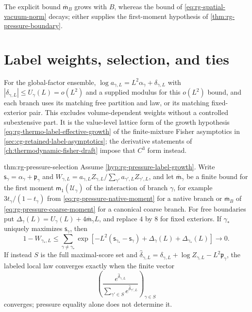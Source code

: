 The explicit bound $\overline{\mathsf m}_B$ grows with $B$, whereas the bound of
\cref{eq:rg-spatial-vacuum-norm} decays; either supplies the first-moment
hypothesis of \cref{thm:rg-pressure-boundary}.

\section{Label weights, selection, and ties}
\label{sec:rg-pressure-selection}

For the global-factor ensemble,
$\log a_{\gamma,L}=L^2\alpha_\gamma+\delta_{\gamma,L}$ with
$|\delta_{\gamma,L}|\leq U_\gamma(L)=o(L^2)$ and a supplied modulus for this
$o(L^2)$ bound, and each branch uses its matching free partition and law, or
its matching fixed-exterior pair. This excludes volume-dependent weights
without a controlled subextensive part. It is the value-level lattice form of
the growth hypothesis \cref{eq:rg-thermo-label-effective-growth} of the
finite-mixture Fisher asymptotics in \cref{sec:cg-retained-label-asymptotics};
the derivative statements of \cref{ch:thermodynamic-fisher-draft} impose that
$C^3$ form instead.

{thm:rg-pressure-selection}
Assume \cref{hyp:rg-pressure-label-growth}. Write
$\mathsf s_\gamma=\alpha_\gamma+\mathfrak p_\gamma$ and
$W_{\gamma,L}=a_{\gamma,L}Z_{\gamma,L}/\sum_{\gamma'}a_{\gamma',L}Z_{\gamma',L}$,
and let $\overline{\mathsf m}_\gamma$ be a finite bound for the first moment
$\mathsf m_1(\mathscr U_\gamma)$ of the interaction of branch $\gamma$, for example
$3t_\gamma/(1-t_\gamma)$ from \cref{eq:rg-pressure-native-moment} for a
native branch or $\overline{\mathsf m}_B$ of
\cref{eq:rg-pressure-coarse-moment} for a canonical coarse branch. For free
boundaries put $\Delta_\gamma(L)=U_\gamma(L)+4\overline{\mathsf m}_\gamma L$,
and replace $4$ by $8$ for fixed exteriors. If $\gamma_*$ uniquely maximizes
$\mathsf s_\gamma$, then
\begin{equation}
 1-W_{\gamma_*,L}\leq\sum_{\gamma\ne\gamma_*}
 \exp\left[-L^2(\mathsf s_{\gamma_*}-\mathsf s_\gamma)
                  +\Delta_\gamma(L)+\Delta_{\gamma_*}(L)\right]\longrightarrow0.
 \label{eq:rg-pressure-selection-bound}
\end{equation}
If instead $S$ is the full maximal-score set and
$\widehat\delta_{\gamma,L}=\delta_{\gamma,L}+\log Z_{\gamma,L}-L^2\mathfrak p_\gamma$,
the labeled local law converges exactly when the finite vector
\begin{equation}
 \left(\frac{e^{\widehat\delta_{\gamma,L}}}
 {\sum_{\gamma'\in S}e^{\widehat\delta_{\gamma',L}}}\right)_{\gamma\in S}
 \label{eq:rg-pressure-tie-vector}
\end{equation}
converges; pressure equality alone does not determine it.

